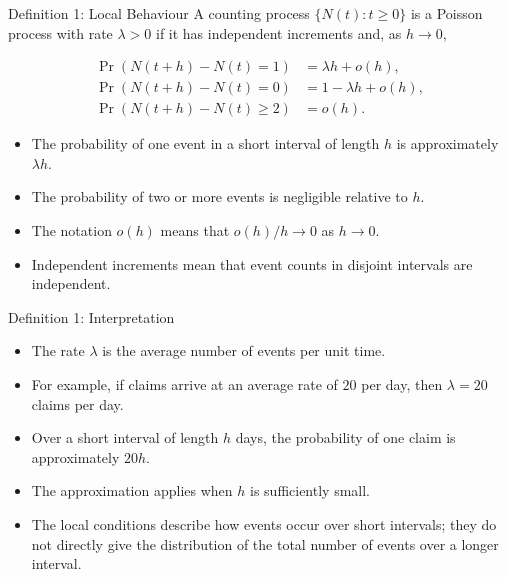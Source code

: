 \documentclass[
  ignorenonframetext,
  aspectratio=169,
]{beamer}
\providecommand{\tightlist}{%
  \setlength{\itemsep}{0pt}\setlength{\parskip}{0pt}}
\begin{document}
\begin{frame}{Definition 1: Local Behaviour}
\protect{}\label{definition-1-local-behaviour}
A counting process \(\{N(t):t\geq0\}\) is a Poisson process with rate
\(\lambda>0\) if it has independent increments and, as \(h\to0\),

\[
\begin{aligned}
\Pr(N(t+h)-N(t)=1)&=\lambda h+o(h),\\
\Pr(N(t+h)-N(t)=0)&=1-\lambda h+o(h),\\
\Pr(N(t+h)-N(t)\geq2)&=o(h).
\end{aligned}
\]

\begin{itemize}
\tightlist
\item
  The probability of one event in a short interval of length \(h\) is
  approximately \(\lambda h\).
\item
  The probability of two or more events is negligible relative to \(h\).
\item
  The notation \(o(h)\) means that \(o(h)/h\to0\) as \(h\to0\).
\item
  Independent increments mean that event counts in disjoint intervals
  are independent.
\end{itemize}
\end{frame}

\begin{frame}{Definition 1: Interpretation}
\protect{}\label{definition-1-interpretation}
\begin{itemize}
\tightlist
\item
  The rate \(\lambda\) is the average number of events per unit time.
\item
  For example, if claims arrive at an average rate of \(20\) per day,
  then \(\lambda=20\) claims per day.
\item
  Over a short interval of length \(h\) days, the probability of one
  claim is approximately \(20h\).
\item
  The approximation applies when \(h\) is sufficiently small.
\item
  The local conditions describe how events occur over short intervals;
  they do not directly give the distribution of the total number of
  events over a longer interval.
\end{itemize}
\end{frame}
\end{document}
